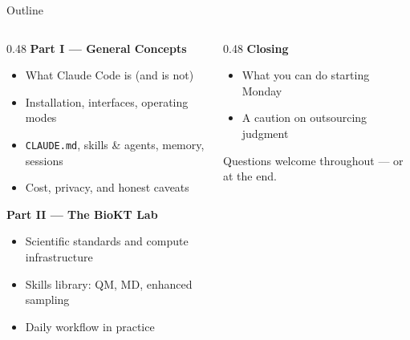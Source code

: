 \documentclass[aspectratio=169, 10pt]{beamer}
\begin{document}
\begin{frame}{Outline}
  \begin{columns}[T]
    \begin{column}{0.48\textwidth}
      \textbf{\color{biokteal}Part I --- General Concepts}
      \begin{itemize}[label=\textbullet]\setlength\itemsep{3pt}
        \item What Claude Code is (and is not)
        \item Installation, interfaces, operating modes
        \item \texttt{CLAUDE.md}, skills \& agents, memory, sessions
        \item Cost, privacy, and honest caveats
      \end{itemize}
      \vspace{0.7em}
      \textbf{\color{biokteal}Part II --- The BioKT Lab}
      \begin{itemize}[label=\textbullet]\setlength\itemsep{3pt}
        \item Scientific standards and compute infrastructure
        \item Skills library: QM, MD, enhanced sampling
        \item Daily workflow in practice
      \end{itemize}
    \end{column}
    \begin{column}{0.48\textwidth}
      \textbf{\color{biokteal}Closing}
      \begin{itemize}[label=\textbullet]\setlength\itemsep{3pt}
        \item What you can do starting Monday
        \item A caution on outsourcing judgment
      \end{itemize}
      \vspace{0.9em}
      \begin{block}{}
        \small Questions welcome throughout --- or at the end.
      \end{block}
    \end{column}
  \end{columns}
\end{frame}
\end{document}
